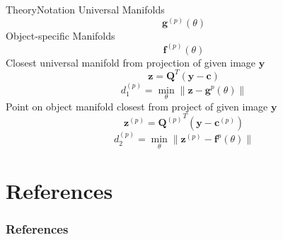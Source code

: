 \documentclass[aspectratio=169, handout, 10pt, hyperref=colorlinks]{beamer}
\begin{document}
\begin{frame}[allowframebreaks]{Theory}{Notation}
Universal Manifolds
    \begin{equation}
        \mathbf{g}^{(p)}(\theta)
\end{equation}
Object-specific Manifolds    
    \begin{equation}
        \mathbf{f}^{(p)}(\theta)
\end{equation}
Closest universal manifold from projection of given image $\mathbf{y}$
  \begin{equation}
     \mathbf{z} = 
        \mathbf{Q}^T
        (\mathbf{y} - \mathbf{c})
    \end{equation}
    \begin{equation}
        d_1^{(p)} = \min_{\theta} \| \mathbf{z} - \mathbf{g}^{p}(\theta) \|
    \end{equation}
Point on object manifold closest from project of given image $\mathbf{y}$
    \begin{equation}
     \mathbf{z}^{(p)} = 
        {\mathbf{Q}^{(p)}}^T
        (\mathbf{y} - \mathbf{c}^{(p)})
    \end{equation}
    \begin{equation}
        d_2^{(p)} = \min_{\theta} \| \mathbf{z}^{(p)} - \mathbf{f}^{p}(\theta) \|
    \end{equation}
\end{frame}

\appendix
\section{References}
\begin{frame}%
  \frametitle<presentation>{References}
%       

  \nocite{*}
  {}
    

 
    

\end{frame}
\end{document}
